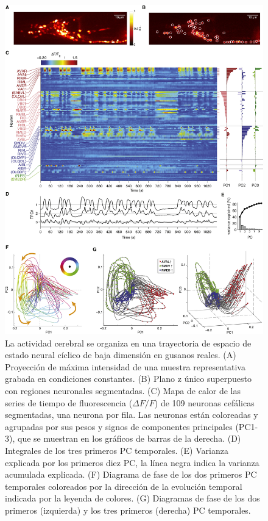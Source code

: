  \begin{figure}[h!]
	\centering\includegraphics[width=\imsize]{kato.jpg}
	\caption[ La actividad cerebral se organiza en una trayectoria de espacio de estado neural cíclico de baja dimensión en gusanos reales.]{ La actividad cerebral se organiza en una trayectoria de espacio de estado neural cíclico de baja dimensión en gusanos reales.  (A) Proyección de máxima intensidad de una muestra representativa grabada en condiciones constantes.
		(B) Plano z único superpuesto con regiones neuronales segmentadas.
		(C) Mapa de calor de las series de tiempo de fluorescencia ($\Delta F/F$) de 109 neuronas cefálicas segmentadas, una neurona por fila.  Las neuronas están coloreadas y agrupadas por sus pesos y signos de componentes principales (PC1-3), que se muestran en los gráficos de barras de la derecha. (D) Integrales de los tres primeros PC temporales. (E) Varianza explicada por los primeros diez PC, la línea negra indica la varianza acumulada explicada. 		(F) Diagrama de fase de los dos primeros PC temporales coloreados por la dirección de la evolución temporal indicada por la leyenda de colores. (G) Diagramas de fase de los dos primeros (izquierda) y los tres primeros (derecha) PC temporales. }\label{fig:kato}
\end{figure}




